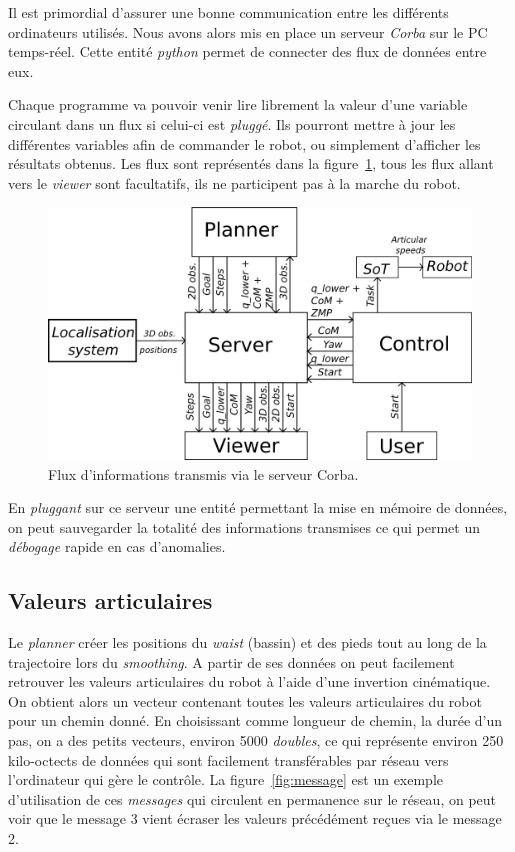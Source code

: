 Il est primordial d'assurer une bonne communication entre les différents ordinateurs utilisés. Nous avons alors mis en place un serveur \emph{Corba} sur le PC temps-réel. Cette entité \emph{python} permet de connecter des flux de données entre eux. 

Chaque programme va pouvoir venir lire librement la valeur d'une variable circulant dans un flux si celui-ci est \emph{pluggé}. Ils pourront mettre à jour les différentes variables afin de commander le robot, ou simplement d'afficher les résultats obtenus. Les flux sont représentés dans la figure~\ref{fig:corba}, tous les flux allant vers le \emph{viewer} sont facultatifs, ils ne participent pas à la marche du robot.

\begin{figure}[h]
\begin{center}
\includegraphics[width=12.0cm]{images/corba.png}
\caption{Flux d'informations transmis via le serveur Corba.}
\label{fig:corba}
\end{center}
\end{figure}

En \emph{pluggant} sur ce serveur une entité permettant la mise en mémoire de données, on peut sauvegarder la totalité des informations transmises ce qui permet un \emph{débogage} rapide en cas d'anomalies.


\subsection{Valeurs articulaires}
\label{sub:valeurs}

Le \emph{planner} créer les positions du \emph{waist} (bassin) et des pieds tout au long de la trajectoire lors du \emph{smoothing}. A partir de ses données on peut facilement retrouver les valeurs articulaires du robot à l'aide d'une invertion cinématique.
On obtient alors un vecteur contenant toutes les valeurs articulaires du robot pour un chemin donné. En choisissant comme longueur de chemin, la durée d'un pas, on a des petits vecteurs, environ 5000 \emph{doubles}, ce qui représente environ 250 kilo-octects de données qui sont facilement transférables par réseau vers l'ordinateur qui gère le contrôle. La figure~\ref{fig:message} est un exemple d'utilisation de ces \emph{messages} qui circulent en permanence sur le réseau, on peut voir que le message 3 vient écraser les valeurs précédément reçues via le message 2.

